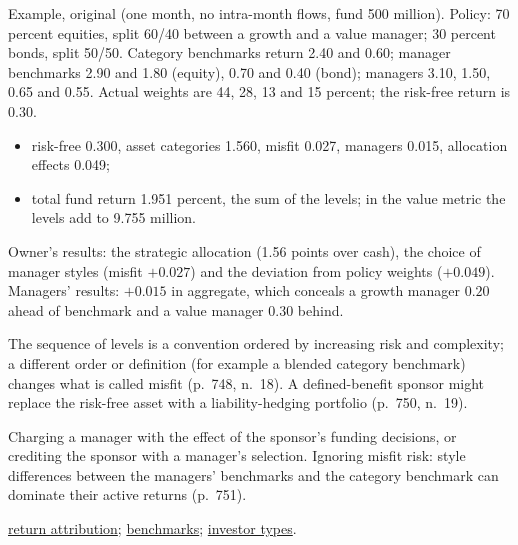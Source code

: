 \begin{qfmethod}
 Example, original (one month, no intra-month flows, fund 500 million). Policy: 70 percent equities, split 60/40 between a growth and a value manager; 30 percent bonds, split 50/50. Category benchmarks return 2.40 and 0.60; manager benchmarks 2.90 and 1.80 (equity), 0.70 and 0.40 (bond); managers 3.10, 1.50, 0.65 and 0.55. Actual weights are 44, 28, 13 and 15 percent; the risk-free return is 0.30.
\begin{itemize}
\item risk-free 0.300, asset categories 1.560, misfit 0.027, managers 0.015, allocation effects 0.049;
\item total fund return 1.951 percent, the sum of the levels; in the value metric the levels add to 9.755 million.
\end{itemize}
Owner's results: the strategic allocation (1.56 points over cash), the choice of manager styles (misfit $+0.027$) and the deviation from policy weights ($+0.049$). Managers' results: $+0.015$ in aggregate, which conceals a growth manager $0.20$ ahead of benchmark and a value manager $0.30$ behind.

 The sequence of levels is a convention ordered by increasing risk and complexity; a different order or definition (for example a blended category benchmark) changes what is called misfit (p.~748, n.~18). A defined-benefit sponsor might replace the risk-free asset with a liability-hedging portfolio (p.~750, n.~19).

 Charging a manager with the effect of the sponsor's funding decisions, or crediting the sponsor with a manager's selection. Ignoring misfit risk: style differences between the managers' benchmarks and the category benchmark can dominate their active returns (p.~751).

 \hyperref[meth:return-attribution]{return attribution}; \hyperref[meth:benchmark-selection-quality]{benchmarks}; \hyperref[def:investor-types-needs]{investor types}.

\end{qfmethod}

